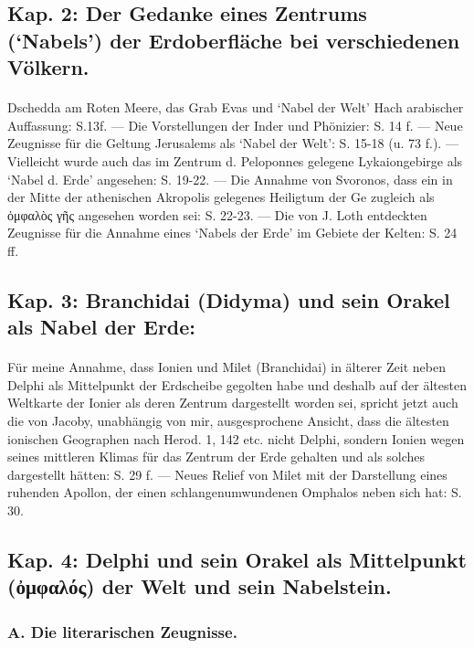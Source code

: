 \documentclass[a4paper, 11pt, oneside]{article}
\begin{document}
\subsection*{Kap. 2: Der Gedanke eines Zentrums (`Nabels') der Erdoberfläche bei verschiedenen Völkern.}
\paragraph{}
Dschedda am Roten Meere, das Grab Evas und `Nabel der Welt' Hach arabischer Auffassung: S.13f. --- Die Vorstellungen der Inder und Phönizier: S. 14 f. --- Neue Zeugnisse für die Geltung Jerusalems als `Nabel der Welt': S. 15-18 (u. 73 f.). --- Vielleicht wurde auch das im Zentrum d. Peloponnes gelegene Lykaiongebirge als `Nabel d. Erde' angesehen: S. 19-22. --- Die Annahme von Svoronos, dass ein in der Mitte der athenischen Akropolis gelegenes Heiligtum der Ge zugleich als ὀμφαλὸς γῆς angesehen worden sei: S. 22-23. --- Die von J. Loth entdeckten Zeugnisse für die Annahme eines `Nabels der Erde' im Gebiete der Kelten: S. 24 ff.

\subsection*{Kap. 3: Branchidai (Didyma) und sein Orakel als Nabel der Erde:}
\paragraph{}
Für meine Annahme, dass Ionien und Milet (Branchidai) in älterer Zeit neben Delphi als Mittelpunkt der Erdscheibe gegolten habe und deshalb auf der ältesten Weltkarte der Ionier als deren Zentrum dargestellt worden sei, spricht jetzt auch die von Jacoby, unabhängig von mir, ausgesprochene Ansicht, dass die ältesten ionischen Geographen nach Herod. 1, 142 etc. nicht Delphi, sondern Ionien wegen seines mittleren Klimas für das Zentrum der Erde gehalten und als solches dargestellt hätten: S. 29 f. --- Neues Relief von Milet mit der Darstellung eines ruhenden Apollon, der einen schlangenumwundenen Omphalos neben sich hat: S. 30.

\subsection*{Kap. 4: Delphi und sein Orakel als Mittelpunkt (ὀμφαλός) der Welt und sein Nabelstein.}
\subsubsection*{A. Die literarischen Zeugnisse.}
\end{document}
